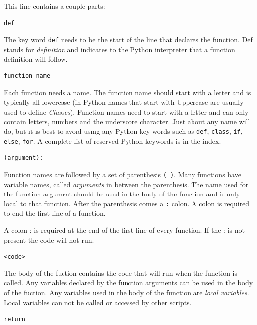 \documentclass{book}
\begin{document}
This line contains a couple parts:

\begin{lstlisting}
def
\end{lstlisting}

The key word \lstinline!def! needs to be the start of the line that
declares the function. Def stands for \emph{definition} and indicates to
the Python interpreter that a function definition will follow.

\begin{lstlisting}
function_name
\end{lstlisting}

Each function needs a name. The function name should start with a letter
and is typically all lowercase (in Python names that start with
Uppercase are usually used to define \emph{Classes}). Function names
need to start with a letter and can only contain letters, numbers and
the underscore character. Just about any name will do, but it is best to
avoid using any Python key words such as \lstinline!def!,
\lstinline!class!, \lstinline!if!, \lstinline!else!, \lstinline!for!. A
complete list of reserved Python keywords is in the index.

\begin{lstlisting}
(argument):
\end{lstlisting}

Function names are followed by a set of parenthesis \lstinline!( )!.
Many functions have variable names, called \emph{arguments} in between
the parenthesis. The name used for the function argument should be used
in the body of the function and is only local to that function. After
the parenthesis comes a \lstinline!:! colon. A colon is required to end
the first line of a function.

A colon : is required at the end of the first line of every function. If
the : is not present the code will not run.

\begin{lstlisting}
<code>
\end{lstlisting}

The body of the fuction contains the code that will run when the
function is called. Any variables declared by the function arguments can
be used in the body of the fuction. Any variables used in the body of
the function are \emph{local variables}. Local variables can not be
called or accessed by other scripts.

\begin{lstlisting}
return
\end{lstlisting}
\end{document}
